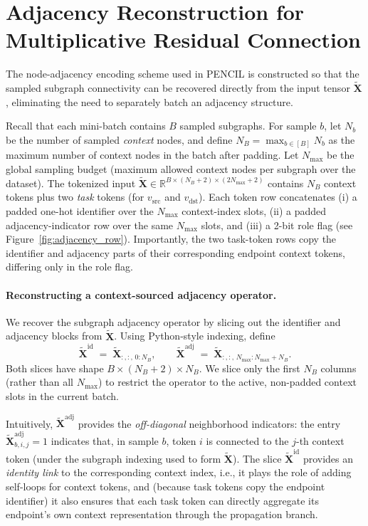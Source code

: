 \documentclass{article}
\theoremstyle{plain}
\theoremstyle{definition}
\theoremstyle{remark}
\begin{document}
\section{Adjacency Reconstruction for Multiplicative Residual Connection}
\label{app:adjacency-recovery}

The node-adjacency encoding scheme \cite{yehudai_depth-width_2025} used in PENCIL is constructed so that the sampled subgraph connectivity can be recovered directly from the input tensor $\tilde{\mathbf{X}}$, eliminating the need to separately batch an adjacency structure.

Recall that each mini-batch contains $B$ sampled subgraphs. For sample $b$, let $N_b$ be the number of sampled \emph{context} nodes, and define $N_B=\max_{b\in[B]}N_b$ as the maximum number of context nodes in the batch after padding. Let $N_{\max}$ be the global sampling budget (maximum allowed context nodes per subgraph over the dataset). The tokenized input \(\tilde{\mathbf{X}} \in \mathbb{R}^{B \times (N_B+2) \times (2N_{\max}+2)}\)
contains $N_B$ context tokens plus two \emph{task} tokens (for $v_{\text{src}}$ and $v_{\text{dst}}$). Each token row concatenates (i) a padded one-hot identifier over the $N_{\max}$ context-index slots, (ii) a padded adjacency-indicator row over the same $N_{\max}$ slots, and (iii) a 2-bit role flag (see Figure~\ref{fig:adjacency_row}). Importantly, the two task-token rows copy the identifier and adjacency parts of their corresponding endpoint context tokens, differing only in the role flag.

\paragraph{Reconstructing a context-sourced adjacency operator.}
We recover the subgraph adjacency operator by slicing out the identifier and adjacency blocks from $\tilde{\mathbf{X}}$. Using Python-style indexing, define
\begin{equation}
\tilde{\mathbf{X}}^{\text{id}} \;=\; \tilde{\mathbf{X}}_{:,:,\,0:N_B}, 
\qquad 
\tilde{\mathbf{X}}^{\text{adj}} \;=\; \tilde{\mathbf{X}}_{:,:,\,N_{\max}:N_{\max}+N_B}.
\end{equation}
Both slices have shape $B\times (N_B+2)\times N_B$. We slice only the first $N_B$ columns (rather than all $N_{\max}$) to restrict the operator to the active, non-padded context slots in the current batch.

Intuitively, $\tilde{\mathbf{X}}^{\text{adj}}$ provides the \emph{off-diagonal} neighborhood indicators: the entry $\tilde{\mathbf{X}}^{\text{adj}}_{b,i,j}=1$ indicates that, in sample $b$, token $i$ is connected to the $j$-th context token (under the subgraph indexing used to form $\tilde{\mathbf{X}}$). The slice $\tilde{\mathbf{X}}^{\text{id}}$ provides an \emph{identity link} to the corresponding context index, i.e., it plays the role of adding self-loops for context tokens, and (because task tokens copy the endpoint identifier) it also ensures that each task token can directly aggregate its endpoint's own context representation through the propagation branch.
\end{document}
